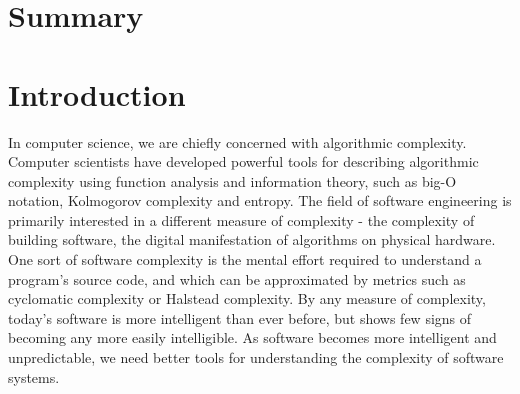 \documentclass[12pt,initial,twoside,maitrise]{dms}
\numberwithin{equation}{section}
\numberwithin{table}{chapter}
\numberwithin{figure}{chapter}
\begin{document}

\chapter*{Summary}


\anglais
\cleardoublepage
{}  %
\tableofcontents
\cleardoublepage
{}  %
\listoftables
\cleardoublepage
{}
\listoffigures

\NoChapterPageNumber
\cleardoublepage
{}

\chapter{Introduction}


In computer science, we are chiefly concerned with algorithmic complexity. Computer scientists have developed powerful tools for describing algorithmic complexity using function analysis and information theory, such as big-O notation, Kolmogorov complexity and entropy. The field of software engineering is primarily interested in a different measure of complexity - the complexity of building software, the digital manifestation of algorithms on physical hardware. One sort of software complexity is the mental effort required to understand a program's source code, and which can be approximated by metrics such as cyclomatic complexity or Halstead complexity. By any measure of complexity, today's software is more intelligent than ever before, but shows few signs of becoming any more easily intelligible. As software becomes more intelligent and unpredictable, we need better tools for understanding the complexity of software systems.
\end{document}
